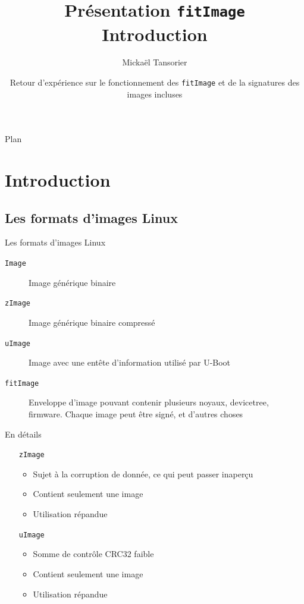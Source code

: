 \documentclass[aspectratio=169]{beamer}
\title[fitImage]{Présentation \texttt{fitImage} \\ \textbf{Introduction}}
\author[Mickaël Tansorier]{Mickaël Tansorier}
\date[Août 2019]{Retour d'expérience sur le fonctionnement des \texttt{fitImage} et \newline de la signatures des images incluses}
\begin{document}

\begin{frame}
\titlepage
\end{frame}



\begin{frame}{Plan}
\tableofcontents[hideallsubsections]
\end{frame}

\section{Introduction}

\subsection{Les formats d'images Linux}

\begin{frame}
\begin{center}
\huge{Les formats d'images Linux}
\end{center}
\end{frame}

\begin{frame}
\begin{description}
	\item[\texttt{Image}] Image générique binaire
	\item[\texttt{zImage}] Image générique binaire compressé
	\item[\texttt{uImage}] Image avec une entête d'information utilisé par U-Boot
	\item[\texttt{fitImage}] Enveloppe d'image pouvant contenir plusieurs noyaux, devicetree, firmware. Chaque image peut être signé, et d'autres choses
\end{description}
\end{frame}

\begin{frame}{En détails}
\begin{itemize}
	\item [\texttt{zImage}]
	\begin{itemize}
		\item Sujet à la corruption de donnée, ce qui peut passer inaperçu
		\item Contient seulement une image
		\item Utilisation répandue
	\end{itemize}
	\item [\texttt{uImage}]
	\begin{itemize}
		\item Somme de contrôle CRC32 faible
		\item Contient seulement une image
		\item Utilisation répandue
	\end{itemize}
\end{itemize}
\end{frame}
\end{document}
